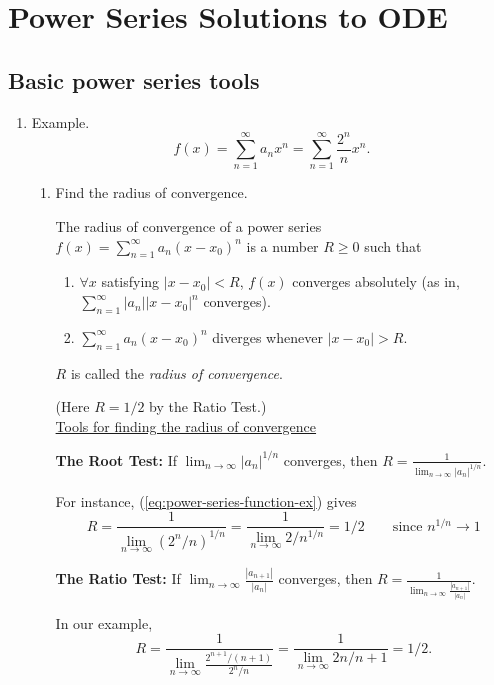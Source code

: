 \documentclass[11pt, letterpaper, oneside]{article}     %
\numberwithin{equation}{subsection}
\theoremstyle{definition}
\numberwithin{theorem}{section}
\theoremstyle{remark}
\newcommand{\ds}{\displaystyle}
\begin{document}
\section{Power Series Solutions to ODE}

\subsection{Basic power series tools}
\begin{enumerate}
\item Example.
  \begin{equation}\label{eq:power-series-function-ex}
    f(x) = \sum_{n=1}^\infty a_nx^n = \sum_{n=1}^\infty\frac{2^n}{n}x^n.
  \end{equation}
  \begin{enumerate}
  \item Find the radius of convergence.

    The radius of convergence of a power series $f(x) = \sum_{n=1}^\infty a_n(x-x_0)^n$ is a number $R \geq 0$ such that
    \begin{enumerate}
    \item $\forall x$ satisfying $|x - x_0| < R$, $f(x)$ converges absolutely (as in, $\sum_{n=1}^\infty |a_n||x-x_0|^n$ converges).
      \item $\sum_{n=1}^\infty a_n(x-x_0)^n$ diverges whenever $|x - x_0| > R$.
    \end{enumerate}
    $R$ is called the \emph{radius of convergence}.

    (Here $R = 1/2$ by the Ratio Test.)\\

    \underline{Tools for finding the radius of convergence}

    \textbf{The Root Test:} If $\ds\lim_{n\to\infty}|a_n|^{1/n}$ converges, then $\ds R = \frac{1}{\lim_{n\to\infty}|a_n|^{1/n}}$.

    For instance, (\ref{eq:power-series-function-ex}) gives
    \begin{equation}
      R = \frac{1}{\lim_{n\to\infty}(2^n/n)^{1/n}} = \frac{1}{\lim_{n\to\infty}2/n^{1/n}}= 1/2\quad\quad\text{since $n^{1/n}\to 1$}
    \end{equation}

    \textbf{The Ratio Test:} If $\ds\lim_{n\to\infty}\frac{|a_{n+1}|}{|a_n|}$ converges, then $\ds R = \frac{1}{\lim_{n\to\infty}\frac{|a_{n+1}|}{|a_n|}}$.

    In our example,
    \begin{equation}
      R = \frac{1}{\lim_{n\to\infty}\frac{2^{n+1}/(n+1)}{2^n/n}} = \frac{1}{\lim_{n\to\infty}2n/n+1}= 1/2.
    \end{equation}


\end{enumerate}
\end{enumerate}
\end{document}
